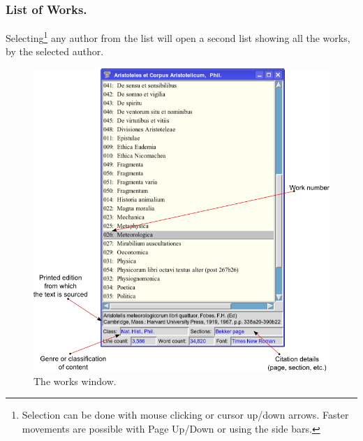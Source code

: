 \documentclass[11pt,a4paper]{article}
\begin{document}
    \subsubsection*{List of Works.} Selecting\footnote{Selection can be done
        with mouse clicking or cursor up/down arrows. Faster movements are possible
        with Page Up/Down or using the side bars.} any author from the list will
        open a second list showing all the works, by the selected
        author.

              \begin{figure}[htb]
                \begin{center}
                  \includegraphics[scale=0.6]{../images/works-en.png}
                  \caption{The works window.}
                \end{center}
              \end{figure}

\end{document}
